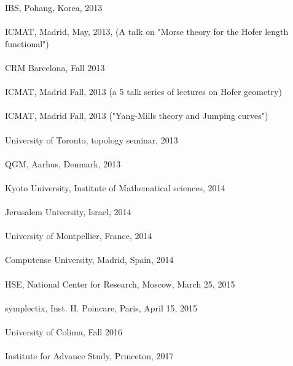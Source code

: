 \documentclass[overlapped,line,letterpaper]{res}
\begin{document}
\begin{resume}
IBS, Pohang, Korea, 2013 \\\\
ICMAT, Madrid, May, 2013,   (A talk on "Morse theory for the Hofer length functional") \\\\
CRM Barcelona, Fall 2013  \\\\
ICMAT, Madrid Fall, 2013 (a 5 talk series of lectures on Hofer geometry) \\\\
ICMAT, Madrid Fall, 2013 ("Yang-Mills theory and Jumping curves") \\\\
University of Toronto, topology seminar, 2013 \\\\
QGM, Aarhus, Denmark, 2013 \\\\
Kyoto University, Institute of Mathematical sciences, 2014 \\\\
Jerusalem University, Israel, 2014 \\\\
University of Montpellier, France, 2014 \\\\
Computense University, Madrid, Spain, 2014\\\\
HSE, National Center for Research, Moscow, March 25, 2015 \\\\
symplectix, Inst. H. Poincare, Paris, April 15, 2015 \\\\
University of Colima, Fall 2016 \\\\
Institute for Advance Study, Princeton, 2017

\end{resume}
\end{document}
